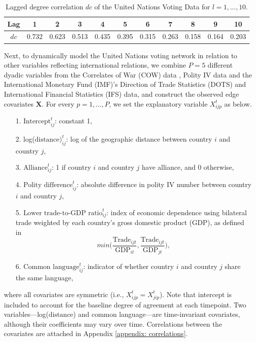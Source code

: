 \documentclass[a4paper]{article}
\begin{document}
\begin{table}[ht]
	\centering
	\begin{tabular}{ |c|c|c|c|c|c|c|c|c|c|c|} 
		\hline
		{Lag}	& 1 & 2& 3& 4& 5& 6& 7&8&9&10 \\ \hline
		$dc$ & 0.732&0.623&0.513&0.435&0.395&0.315&0.263&0.158&0.164& 0.203\\\hline
	\end{tabular}
	\caption {Lagged degree correlation $dc$ of the United Nations Voting Data for $l=1,\ldots, 10$.}
	\label{table:corr}
\end{table}
\newline Next, to dynamically model the United Nations voting network in relation to other variables reflecting international relations, we combine $P=5$ different dyadic variables from the Correlates of War (COW) data \citep{gibler2008international}, Polity IV data \citep{marshall2014polity} and the International Monetary Fund (IMF)'s Direction of Trade Statistics (DOTS) and International Financial Statistics (IFS) data, and construct the observed edge covariates $\mathbf{X}$. For every $p=1,\ldots,P$, we set the explanatory variable $X^t_{ijp}$ as below.
\begin{itemize}
	\item [1.] $\mbox{Intercept}^t_{ij}$: constant 1,
	\item [2.] log($\mbox{distance})^t_{ij}$: log of the geographic distance between country $i$ and country $j$,
	\item [3.] $\mbox{Alliance}^t_{ij}$: 1 if country $i$ and country $j$ have alliance, and 0 otherwise,
	\item [4.] $\mbox{Polity difference}^t_{ij}$: absolute difference in polity IV number between country $i$ and country $j$,
	\item [5.] $\mbox{Lower trade-to-GDP ratio}^t_{ij}$: index of economic dependence using bilateral trade weighted by each country's gross domestic product (GDP), as defined in \cite{gartzke2000preferences} $$min\Big(\frac{\mbox{Trade}_{ijt}}{\mbox{GDP}_{it}}, \frac{\mbox{Trade}_{ijt}}{\mbox{GDP}_{jt}}\Big),$$
	\item [6.] $\mbox{Common language}^t_{ij}$: indicator of whether country $i$ and country $j$ share the same language,
\end{itemize}
where all covariates are symmetric (i.e., $X^t_{ijp}=X^t_{jip}$). Note that intercept is included to account for the baseline degree of agreement at each timepoint. Two variables---log($\mbox{distance}$) and common language---are time-invariant covariates, although their coefficients may vary over time. Correlations between the covariates are attached in Appendix \ref{appendix: correlations}.\\\newline
\end{document}
